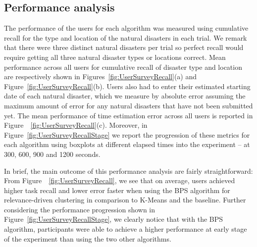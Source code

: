 \subsection{Performance analysis}

The performance of the users for each algorithm was measured using cumulative recall for the type and location of the natural disasters in each trial.  We remark that there were three distinct natural disasters per trial so perfect recall would require getting all three natural disaster types or locations correct.  Mean performance across all users for cumulative recall of disaster type and location are respectively shown in Figures~\ref{fig:UserSurveyRecall}(a) and Figure~\ref{fig:UserSurveyRecall}(b).  Users also had to enter their estimated starting date of each natural disaster, which we measure by absolute error assuming the maximum amount of error for any natural disasters that have not been submitted yet.  The mean performance of time estimation error across all users is reported in Figure~~\ref{fig:UserSurveyRecall}(c).  Moreover, in Figure~\ref{fig:UserSurveyRecallStage} we report the progression of these metrics for each algorithm using boxplots at different elapsed times into the experiment -- at 300, 600, 900 and 1200 seconds.

In brief, the main outcome of this performance analysis are fairly straightforward: 
From Figure~~\ref{fig:UserSurveyRecall}, we see that on average, users achieved higher task recall and lower error faster when using the BPS algorithm for relevance-driven clustering in comparison to K-Means and the baseline.
Further considering the performance progression shown in Figure~\ref{fig:UserSurveyRecallStage}, we clearly notice that with the BPS algorithm, participants were able to achieve a higher performance at early stage of the experiment than using the two other algorithms. 


